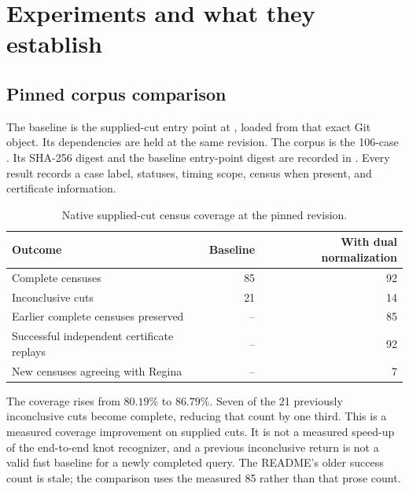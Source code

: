 \section{Experiments and what they establish}
\label{sec:experiments}

\subsection{Pinned corpus comparison}
The baseline is the supplied-cut entry point at \basecommit, loaded from
that exact Git object.  Its dependencies are held at the same revision.
The corpus is the 106-case .
Its SHA-256 digest and the baseline entry-point digest are recorded in
.  Every result records a case label,
statuses, timing scope, census when present, and certificate information.

\begin{table}[htbp]
\centering
\caption{Native supplied-cut census coverage at the pinned revision.}
\label{tab:coverage}
\begin{tabular}{lrr}
\toprule
Outcome & Baseline & With dual normalization\\
\midrule
Complete censuses & 85 & 92\\
Inconclusive cuts & 21 & 14\\
Earlier complete censuses preserved & -- & 85\\
Successful independent certificate replays & -- & 92\\
New censuses agreeing with Regina & -- & 7\\
\bottomrule
\end{tabular}
\end{table}

The coverage rises from $80.19\%$ to $86.79\%$.  Seven of the 21
previously inconclusive cuts become complete, reducing that count by one
third.  This is a measured coverage improvement on supplied cuts.  It is
not a measured speed-up of the end-to-end knot recognizer, and a previous
inconclusive return is not a valid fast baseline for a newly completed
query.  The README's older success count is stale; the comparison uses
the measured 85 rather than that prose count.

